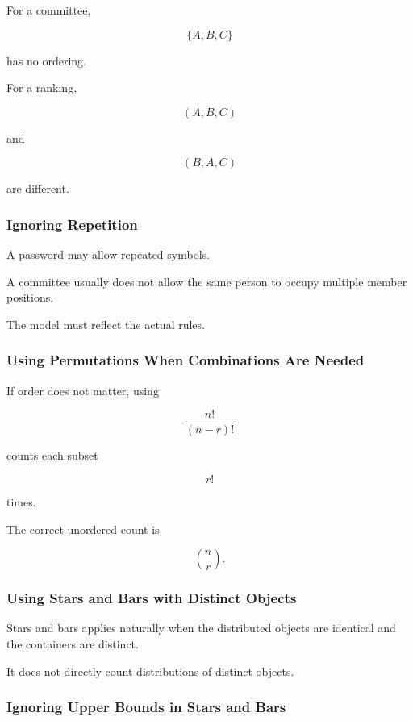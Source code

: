 For a committee,

\[
\{A,B,C\}
\]

has no ordering.

For a ranking,

\[
(A,B,C)
\]

and

\[
(B,A,C)
\]

are different.

\subsubsection{Ignoring Repetition}

A password may allow repeated symbols.

A committee usually does not allow the same person to occupy multiple
member positions.

The model must reflect the actual rules.

\subsubsection{Using Permutations When Combinations Are Needed}

If order does not matter, using

\[
\frac{n!}{(n-r)!}
\]

counts each subset

\[
r!
\]

times.

The correct unordered count is

\[
\binom{n}{r}.
\]

\subsubsection{Using Stars and Bars with Distinct Objects}

Stars and bars applies naturally when the distributed objects are
identical and the containers are distinct.

It does not directly count distributions of distinct objects.

\subsubsection{Ignoring Upper Bounds in Stars and Bars}

